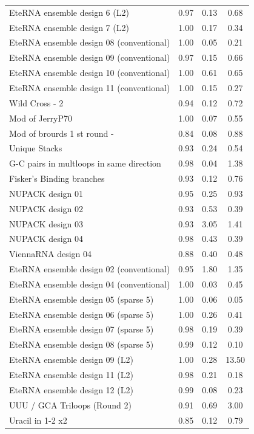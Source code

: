 \documentclass[letter]{bioinfo}
\begin{document}
\begin{center}
\begin{longtable}{l ccc}
EteRNA ensemble design 6 (L2)		&0.97 	&0.13 	&0.68 \\
EteRNA ensemble design 7 (L2)		&1.00 	&0.17 	&0.34 \\
EteRNA ensemble design 08 (conventional)		&1.00 	&0.05 	&0.21 \\
EteRNA ensemble design 09 (conventional)		&0.97 	&0.15 	&0.66 \\
EteRNA ensemble design 10 (conventional)		&1.00 	&0.61 	&0.65 \\
EteRNA ensemble design 11 (conventional)		&1.00 	&0.15 	&0.27 \\
Wild Cross - 	2				&0.94 	&0.12 	&0.72 \\
Mod of JerryP70				&1.00 	&0.07 	&0.55 \\
Mod of brourds 1 st round -		&0.84 	&0.08 	&0.88 \\
Unique Stacks					&0.93 	&0.24 	&0.54 \\
G-C pairs in multloops in same direction		&0.98 	&0.04 	&1.38 \\
Fisker's Binding branches		&0.93 	&0.12 	&0.76 \\
NUPACK design 01				&0.95 	&0.25 	&0.93 \\
NUPACK design 02				&0.93 	&0.53 	&0.39 \\
NUPACK design 03				&0.93 	&3.05 	&1.41 \\
NUPACK design 04				&0.98 	&0.43 	&0.39 \\
ViennaRNA design 04			&0.88 	&0.40 	&0.48 \\
EteRNA ensemble design 02 (conventional)		&0.95 	&1.80 	&1.35 \\
EteRNA ensemble design 04 (conventional)		&1.00 	&0.03 	&0.45 \\
EteRNA ensemble design 05 (sparse 5)		&1.00 	&0.06 	&0.05 \\
EteRNA ensemble design 06 (sparse 5)		&1.00 	&0.26 	&0.41 \\
EteRNA ensemble design 07 (sparse 5)		&0.98 	&0.19 	&0.39 \\
EteRNA ensemble design 08 (sparse 5)		&0.99 	&0.12 	&0.10 \\
EteRNA ensemble design 09 (L2)		&1.00 	&0.28 	&13.50 \\
EteRNA ensemble design 11 (L2)		&0.98 	&0.21 	&0.18 \\
EteRNA ensemble design 12 (L2)		&0.99 	&0.08 	&0.23 \\
UUU / GCA Triloops (Round 2)	&0.91 	&0.69 	&3.00 \\
Uracil in 1-2 x2				&0.85 	&0.12 	&0.79 \\

\end{longtable}
\end{center}
\end{document}
